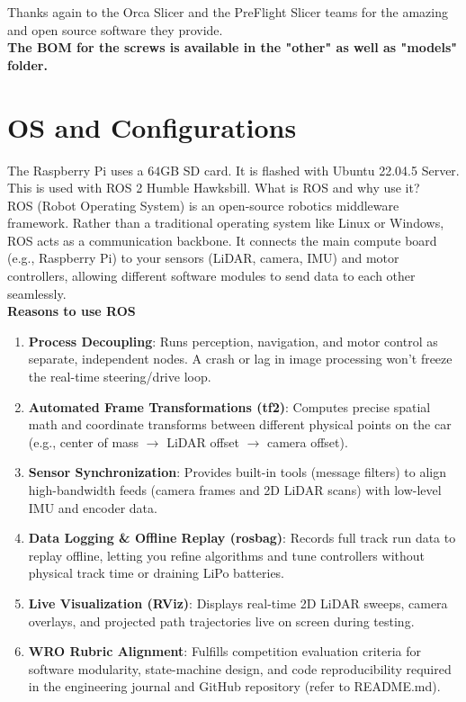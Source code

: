 \documentclass[12pt,a4paper]{article}
\begin{document}
Thanks again to the Orca Slicer and the PreFlight Slicer teams for the amazing and open source software they provide. \\

\textbf{The BOM for the screws is available in the "other" as well as "models" folder.}



\pagebreak

\section{OS and Configurations}


The Raspberry Pi uses a $64$GB SD card. It is flashed with Ubuntu 22.04.5 Server. This is used with ROS 2 Humble Hawksbill. What is ROS and why use it?\\

ROS (Robot Operating System) is an open-source robotics middleware framework. Rather than a traditional operating system like Linux or Windows, ROS acts as a communication backbone. It connects the main compute board (e.g., Raspberry Pi) to your sensors (LiDAR, camera, IMU) and motor controllers, allowing different software modules to send data to each other seamlessly. \\

\textbf{Reasons to use ROS}
\begin{enumerate}
\item \textbf{Process Decoupling}: Runs perception, navigation, and motor control as separate, independent nodes. A crash or lag in image processing won't freeze the real-time steering/drive loop.
\item \textbf{Automated Frame Transformations (tf2)}: Computes precise spatial math and coordinate transforms between different physical points on the car (e.g., center of mass $\rightarrow$ LiDAR offset $\rightarrow$ camera offset).
\item \textbf{Sensor Synchronization}: Provides built-in tools (message filters) to align high-bandwidth feeds (camera frames and 2D LiDAR scans) with low-level IMU and encoder data.
\item \textbf{Data Logging \& Offline Replay (rosbag)}: Records full track run data to replay offline, letting you refine algorithms and tune controllers without physical track time or draining LiPo batteries.
\item \textbf{Live Visualization (RViz)}: Displays real-time 2D LiDAR sweeps, camera overlays, and projected path trajectories live on screen during testing.
\item \textbf{WRO Rubric Alignment}: Fulfills competition evaluation criteria for software modularity, state-machine design, and code reproducibility required in the engineering journal and GitHub repository (refer to README.md).
\end{enumerate}
\end{document}
